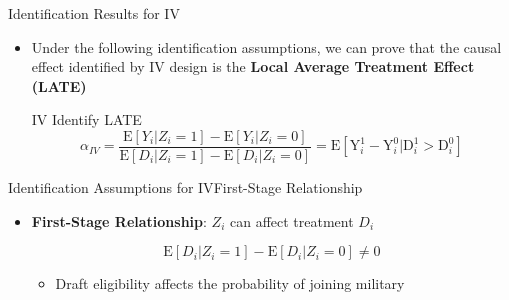 \documentclass[dvipsnames,hyperref={pdfpagelabels=false}]{beamer}
\begin{document}
\begin{frame}{Identification Results for IV}
	\begin{itemize}
		
		\item Under the following identification assumptions, we can prove that the causal effect identified by IV design is the \textbf{Local Average Treatment Effect (LATE)} 
		\vspace{0.2cm}
	

\begin{block}{IV Identify LATE}
	\begin{equation*}
		\alpha_{IV}=\dfrac{\mathrm{E}[Y_{i}|Z_{i}=1]-\mathrm{E}[Y_{i}|Z_{i}=0]}{\mathrm{E}[D_{i}|Z_{i}=1]-\mathrm{E}[D_{i}|Z_{i}=0]} 
		= \mathrm{E}[ \mathrm{Y}^{1}_{i} - \mathrm{Y}^{0}_{i} | \mathrm{D}^{1}_{i} > \mathrm{D}^{0}_{i}]
	\end{equation*} 
\end{block}		
		
	\end{itemize}
\end{frame}




\begin{frame}{Identification Assumptions for IV}{First-Stage Relationship}
	\begin{itemize}
		
		\item \textbf{First-Stage Relationship}: $Z_{i}$ can affect treatment $D_{i}$
		
		\begin{equation*}
			\mathrm{E}[D_{i}|Z_{i}=1]-\mathrm{E}[D_{i}|Z_{i}=0] \neq 0
		\end{equation*}
		
			\begin{itemize}
		\vspace{0.2cm}
		\item Draft eligibility affects the probability of joining military
			\end{itemize}
	
		
	\end{itemize}
\end{frame}
\end{document}
